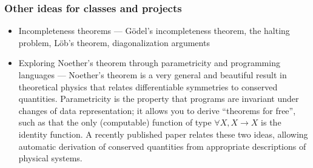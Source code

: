 \documentclass{article}
\begin{document}
\subsubsection*{Other ideas for classes and projects}
\begin{itemize}
  \item
    Incompleteness theorems --- G\"odel's incompleteness theorem, the halting problem, L\"ob's theorem, diagonalization arguments
  \item
    Exploring Noether's theorem through parametricity and programming languages --- Noether's theorem is a very general and beautiful result in theoretical physics that relates differentiable symmetries to conserved quantities.  Parametricity is the property that programs are invariant under changes of data representation; it allows you to derive ``theorems for free'', such as that the only (computable) function of type $\forall X, X \to X$ is the identity function.  A recently published paper%
    relates these two ideas, allowing automatic derivation of conserved quantities from appropriate descriptions of physical systems.  %

\end{itemize}
\end{document}
